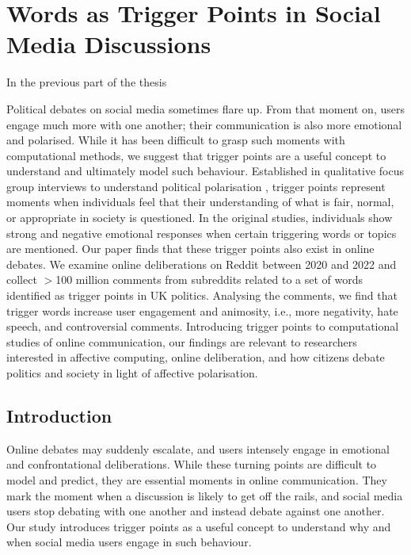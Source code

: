 \chapter{Words as Trigger Points in Social Media Discussions}
\label{ch:triggers}

In the previous part of the thesis 

Political debates on social media sometimes flare up. From that moment on, users engage much more with one another; their communication is also more emotional and polarised. While it has been difficult to grasp such moments with computational methods, we suggest that trigger points are a useful concept to understand and ultimately model such behaviour. Established in qualitative focus group interviews to understand political polarisation \citep{mau2023triggerpunkte}, trigger points represent moments when individuals feel that their understanding of what is fair, normal, or appropriate in society is questioned. In the original studies, individuals show strong and negative emotional responses when certain triggering words or topics are mentioned. Our paper finds that these trigger points also exist in online debates. We examine online deliberations on Reddit between 2020 and 2022 and collect $>$100 million comments from subreddits related to a set of words identified as trigger points in UK politics. Analysing the comments, we find that trigger words increase user engagement and animosity, i.e., more negativity, hate speech, and controversial comments. Introducing trigger points to computational studies of online communication, our findings are relevant to researchers interested in affective computing, online deliberation, and how citizens debate politics and society in light of affective polarisation.

\section{Introduction}
Online debates may suddenly escalate, and users intensely engage in emotional and confrontational deliberations. While these turning points are difficult to model and predict, they are essential moments in online communication. They mark the moment when a discussion is likely to get off the rails, and social media users stop debating with one another and instead debate against one another. Our study introduces trigger points as a useful concept to understand why and when social media users engage in such behaviour.

